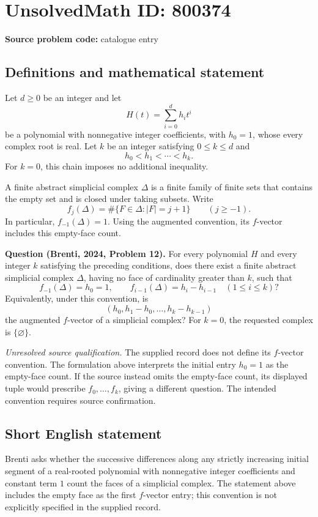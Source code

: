 \documentclass[11pt]{article}
\begin{document}
\section*{UnsolvedMath ID: 800374}
\textbf{Source problem code:} catalogue entry
\subsection{Definitions and mathematical statement}
Let \(d\geq 0\) be an integer and let
\[
H(t)=\sum_{i=0}^{d}h_i t^i
\]
be a polynomial with nonnegative integer coefficients, with \(h_0=1\), whose every complex root is real. Let \(k\) be an integer satisfying \(0\leq k\leq d\) and
\[
h_0<h_1<\cdots<h_k.
\]
For \(k=0\), this chain imposes no additional inequality.

A finite abstract simplicial complex \(\Delta\) is a finite family of finite sets that contains the empty set and is closed under taking subsets. Write
\[
f_j(\Delta)=\#\{F\in\Delta:|F|=j+1\}\qquad(j\geq -1).
\]
In particular, \(f_{-1}(\Delta)=1\). Using the augmented convention, its \(f\)-vector includes this empty-face count.

\textbf{Question (Brenti, 2024, Problem 12).} For every polynomial \(H\) and every integer \(k\) satisfying the preceding conditions, does there exist a finite abstract simplicial complex \(\Delta\), having no face of cardinality greater than \(k\), such that
\[
f_{-1}(\Delta)=h_0=1,
\qquad
f_{i-1}(\Delta)=h_i-h_{i-1}\quad(1\leq i\leq k)?
\]
Equivalently, under this convention, is
\[
(h_0,h_1-h_0,\ldots,h_k-h_{k-1})
\]
the augmented \(f\)-vector of a simplicial complex? For \(k=0\), the requested complex is \(\{\varnothing\}\).

\textit{Unresolved source qualification.} The supplied record does not define its \(f\)-vector convention. The formulation above interprets the initial entry \(h_0=1\) as the empty-face count. If the source instead omits the empty-face count, its displayed tuple would prescribe \(f_0,\ldots,f_k\), giving a different question. The intended convention requires source confirmation.
\subsection{Short English statement}
Brenti asks whether the successive differences along any strictly increasing initial segment of a real-rooted polynomial with nonnegative integer coefficients and constant term \(1\) count the faces of a simplicial complex. The statement above includes the empty face as the first \(f\)-vector entry; this convention is not explicitly specified in the supplied record.
\end{document}
